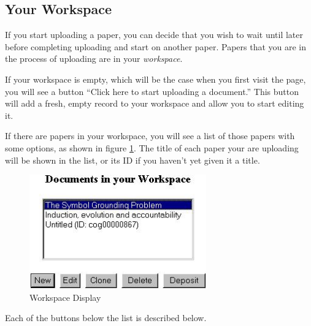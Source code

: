 \subsection{Your Workspace}

If you start uploading a paper, you can decide that you wish to wait until later before completing uploading and start on another paper. Papers that you are in the process of uploading are in your \emph{workspace}.

If your workspace is empty, which will be the case when you first visit the page, you will see a button ``Click here to start uploading a document.'' This button will add a fresh, empty record to your workspace and allow you to start editing it.

If there are papers in your workspace, you will see a list of those papers with some options, as shown in figure \ref{workspace_shot}. The title of each paper your are uploading will be shown in the list, or its ID if you haven't yet given it a title.

\begin{figure}
\centerline{\includegraphics[width=3.0in]{images/workspace-shot}}
\caption{\label{workspace_shot} Workspace Display}
\end{figure}

Each of the buttons below the list is described below.

